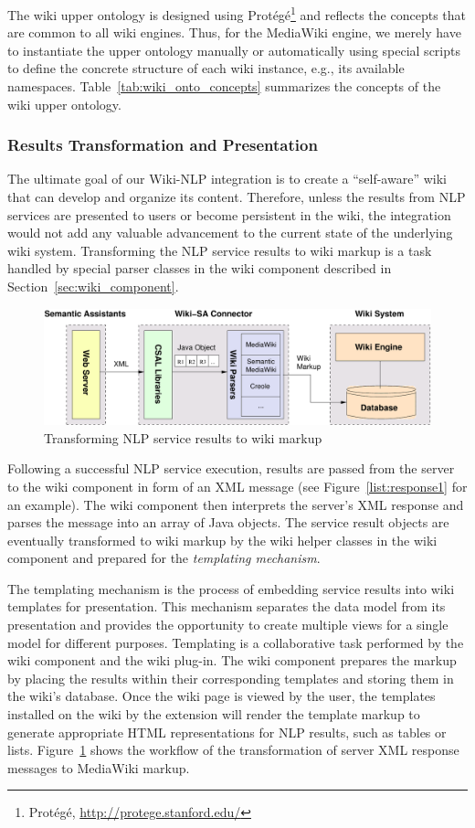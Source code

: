 The wiki upper ontology is designed using Prot\'{e}g\'{e}\footnote{Prot\'{e}g\'{e}, \url{http://protege.stanford.edu/}} and reflects the concepts that are common to all wiki engines. Thus, for the MediaWiki engine, we merely have to instantiate the upper ontology manually or automatically using special scripts to define the concrete structure of each wiki instance, e.g., its available namespaces. Table~\ref{tab:wiki_onto_concepts} summarizes the concepts of the wiki upper ontology.

\subsubsection{Results Transformation and Presentation}
The ultimate goal of our Wiki-NLP integration is to create a ``self-aware'' wiki that can develop and organize its content. Therefore, unless the results from NLP services are presented to users or become persistent in the wiki, the integration would not add any valuable advancement to the current state of the underlying wiki system. Transforming the NLP service results to wiki markup is a task handled by special parser classes in the wiki component described in Section~\ref{sec:wiki_component}.

\begin{figure}[h!]
\centering
\includegraphics[width=0.7\columnwidth]{pictures/result_transform.pdf}
\caption{Transforming NLP service results to wiki markup}
\label{fig:result_transform}
\end{figure}

Following a successful NLP service execution, results are passed from the \sa server to the wiki component in form of an XML message (see Figure~\ref{list:response1} for an example). The wiki component then interprets the server's XML response and parses the message into an array of Java objects. The service result objects are eventually transformed to wiki markup by the wiki helper classes in the wiki component and prepared for the \emph{templating mechanism}. 

The templating mechanism is the process of embedding service results into wiki templates for presentation. This mechanism separates the data model from its presentation and provides the opportunity to create multiple views for a single model for different purposes. Templating is a collaborative task performed by the wiki component and the wiki plug-in. The wiki component prepares the markup by placing the results within their corresponding templates and storing them in the wiki's database. Once the wiki page is viewed by the user, the templates installed on the wiki by the \sa extension will render the template markup to generate appropriate HTML representations for NLP results, such as tables or lists. Figure~\ref{fig:result_transform} shows the workflow of the transformation of server XML response messages to MediaWiki markup.

